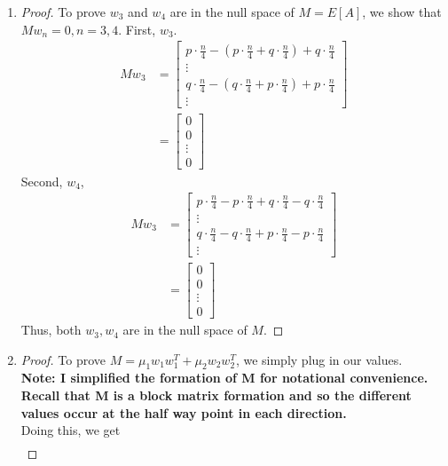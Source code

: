\documentclass[11pt]{article}
\begin{document}
\begin{enumerate}
	\item
	\begin{proof}
	To prove $w_3$ and $w_4$ are in the null space of $M = E[A]$, we show that $Mw_n = 0, n = 3, 4$.
	First, $w_3$.
	\begin{align*}
		Mw_3 &=
		\begin{bmatrix}
			p \cdot \frac{n}{4} - (p \cdot \frac{n}{4} + q \cdot \frac{n}{4}) + q \cdot \frac{n}{4} \\
			\vdots \\
			q \cdot \frac{n}{4} - (q \cdot \frac{n}{4} + p \cdot \frac{n}{4}) + p \cdot \frac{n}{4} \\
			\vdots
		\end{bmatrix} \\
		&=
		\begin{bmatrix}
		0 \\
		0 \\
		\vdots \\
		0
		\end{bmatrix}
	\end{align*}
	Second, $w_4$,
	\begin{align*}
		Mw_3 &=
		\begin{bmatrix}
			p \cdot \frac{n}{4} - p \cdot \frac{n}{4} + q \cdot \frac{n}{4} - q \cdot \frac{n}{4} \\
			\vdots \\
			q \cdot \frac{n}{4} - q \cdot \frac{n}{4} + p \cdot \frac{n}{4} - p \cdot \frac{n}{4} \\
			\vdots
		\end{bmatrix} \\
		&=
		\begin{bmatrix}
		0 \\
		0 \\
		\vdots \\
		0
		\end{bmatrix}
	\end{align*}
	Thus, both $w_3, w_4$ are in the null space of $M$.
	\end{proof}
	\item
	\begin{proof}
	To prove $M = \mu_1 w_1 w_1^T + \mu_2 w_2 w_2^T$, we simply plug in our values. \\
	\textbf{Note: I simplified the formation of M for notational convenience. Recall that M is a block matrix formation and so the different values occur at the half way point in each direction.} \\
	Doing this, we get
	\begin{align*}

\end{align*}
\end{proof}
\end{enumerate}
\end{document}

